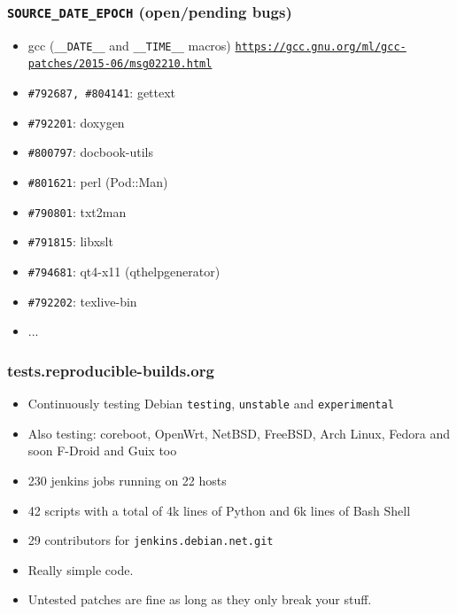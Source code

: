 \documentclass[14pt]{beamer}
\begin{document}
\begin{frame}
 \frametitle{\texttt{SOURCE\_DATE\_EPOCH} (open/pending bugs)}

 \begin{itemize}
  \item gcc (\texttt{\_\_DATE\_\_} and \texttt{\_\_TIME\_\_} macros) \texttt{\footnotesize{\url{https://gcc.gnu.org/ml/gcc-patches/2015-06/msg02210.html}}}
  \item \texttt{\#792687, \#804141}: gettext
  \item \texttt{\#792201}: doxygen
  \item \texttt{\#800797}: docbook-utils
  \item \texttt{\#801621}: perl (Pod::Man)
  \item \texttt{\#790801}: txt2man
  \item \texttt{\#791815}: libxslt
  \item \texttt{\#794681}: qt4-x11 (qthelpgenerator)
  \item \texttt{\#792202}: texlive-bin
  \item ...
 \end{itemize}

\end{frame}


\begin{frame}
 \frametitle{tests.reproducible-builds.org}

 \begin{itemize}
  \item Continuously testing Debian \texttt{testing}, \texttt{unstable} and
  \texttt{experimental}
  \item Also testing: coreboot, OpenWrt, NetBSD, FreeBSD,
  Arch Linux, Fedora and soon F-Droid and Guix too
  \item<2-3> 230 jenkins jobs running on 22 hosts
  \item<2-3> 42 scripts with a total of 4k lines of Python and 6k lines of Bash
  Shell
  \item<2-3> 29 contributors for \texttt{jenkins.debian.net.git}
  \item<3> Really simple code.
  \item<3> Untested patches are fine as long as they only break your stuff.
 \end{itemize}
\end{frame}
\end{document}
